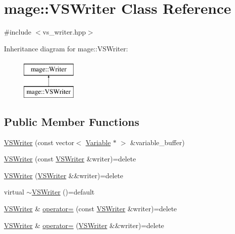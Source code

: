 \hypertarget{classmage_1_1_v_s_writer}{}\section{mage\+:\+:V\+S\+Writer Class Reference}
\label{classmage_1_1_v_s_writer}


{\ttfamily \#include $<$vs\+\_\+writer.\+hpp$>$}

Inheritance diagram for mage\+:\+:V\+S\+Writer\+:\begin{figure}[H]
\begin{center}
\leavevmode
\includegraphics[height=2.000000cm]{classmage_1_1_v_s_writer}
\end{center}
\end{figure}
\subsection*{Public Member Functions}
\begin{DoxyCompactItemize}
\item 
\hyperlink{classmage_1_1_v_s_writer_a401e3661cf197c20a011792221443e8f}{V\+S\+Writer} (const vector$<$ \hyperlink{structmage_1_1_variable}{Variable} $\ast$ $>$ \&variable\+\_\+buffer)
\item 
\hyperlink{classmage_1_1_v_s_writer_a77d146f812d9d37ee99c31133d3597b8}{V\+S\+Writer} (const \hyperlink{classmage_1_1_v_s_writer}{V\+S\+Writer} \&writer)=delete
\item 
\hyperlink{classmage_1_1_v_s_writer_a0e35e2cfa8142ba4176c6259d26ce1b1}{V\+S\+Writer} (\hyperlink{classmage_1_1_v_s_writer}{V\+S\+Writer} \&\&writer)=delete
\item 
virtual \hyperlink{classmage_1_1_v_s_writer_ac2268dde1a58f0d1d657e584e33e82fe}{$\sim$\+V\+S\+Writer} ()=default
\item 
\hyperlink{classmage_1_1_v_s_writer}{V\+S\+Writer} \& \hyperlink{classmage_1_1_v_s_writer_af943d317ae357723a08b2bbf2bab23ba}{operator=} (const \hyperlink{classmage_1_1_v_s_writer}{V\+S\+Writer} \&writer)=delete
\item 
\hyperlink{classmage_1_1_v_s_writer}{V\+S\+Writer} \& \hyperlink{classmage_1_1_v_s_writer_af1dca5c791cfb62967cd2437f7db170a}{operator=} (\hyperlink{classmage_1_1_v_s_writer}{V\+S\+Writer} \&\&writer)=delete
\end{DoxyCompactItemize}
